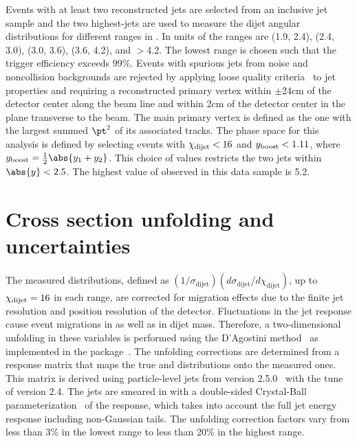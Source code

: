 \documentclass[11pt,twoside,a4paper,cmspaper,final,collab]{cms-tdr}
\begin{document}
Events with at least two reconstructed jets are selected from an
inclusive
jet sample and the two highest-\pt jets are used to measure the dijet
angular distributions for different ranges in \mjj. In units of \TeV the \mjj ranges are (1.9, 2.4),
(2.4, 3.0), (3.0, 3.6), (3.6, 4.2), and $>$4.2. The lowest
\mjj range is chosen such that the trigger efficiency exceeds
99\%. Events with spurious jets from noise and noncollision
backgrounds are rejected by applying loose quality criteria~\cite{CMS-PAS-JME-10-001} to jet
properties and requiring a reconstructed primary vertex within $\pm$24\unit{cm} of the detector center along the beam line and within
2\unit{cm} of the detector center in the plane transverse to the
beam.
The main primary vertex is defined as the one with the largest
summed $\pt^2$ of its associated tracks.
The phase space for this analysis is defined by selecting
events with $\chi_\text{dijet} < 16$ and $y_\text{boost} < 1.11$, where
$\yboost = \frac{1}{2}\abs{y_1 + y_2}$.
This choice of values restricts the two jets within $\abs{y}<2.5$.
The highest value of \mjj observed
in this data sample is 5.2\TeV.

\section{Cross section unfolding and uncertainties}

The measured \chijj distributions, defined as
$(1/\sigma_\text{dijet})(d\sigma_\text{dijet}/d\chi_\text{dijet})$,
up to $\chi_\text{dijet} = 16$ in each \mjj range, are corrected
for migration effects due to the finite jet \pt resolution and position resolution of the
detector.  Fluctuations in the jet response cause event migrations in
\chijj as well as in dijet mass. Therefore, a two-dimensional unfolding
in these variables is performed using the D'Agostini
method~\cite{D'Agostini:1994zf} as implemented in the \RooUnfold
package~\cite{Adye:2011gm}. The unfolding corrections are determined
from a response matrix that maps the true \mjj and \chijj
distributions onto the measured ones.
This matrix is derived using particle-level jets from \HERWIGpp
version 2.5.0~\cite{herwig25,Bahr:2008pv} with the tune of version 2.4.
The jets are smeared in \pt with a double-sided Crystal-Ball
parameterization~\cite{oreglia} of the response, which takes into account the full jet
energy response including non-Gaussian tails. The unfolding
correction factors vary from less than 3\% in the lowest \mjj range to
less than 20\% in the highest \mjj range.
\end{document}
